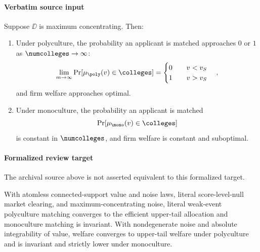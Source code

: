 \documentclass[10pt]{article}
\begin{document}
\paragraph{Verbatim source input}
\begin{ReviewVerbatim}
\begin{theorem}\label{thm:wisdom}
    Suppose $\DD$ is maximum concentrating. Then:
    \begin{enumerate}
        \item[(i)] Under polyculture, the probability an applicant is matched approaches $0$ or $1$ as $\numcolleges\rightarrow \infty$:
            \begin{equation}
                \lim_{m\rightarrow \infty} \Pr[\mu_{\poly}(v)\in \colleges]
                = \begin{cases}
                    0 &\quad v < v_S \\
                    1 &\quad v > v_S
                \end{cases}
                \quad,
            \end{equation}
            and firm welfare approaches optimal.
        \item[(ii)] Under monoculture, the probability an applicant is matched
        \begin{equation}
            \Pr[\mu_{\mono}(v)\in \colleges]
        \end{equation}
        is constant in $\numcolleges$, and firm welfare is constant and suboptimal.
    \end{enumerate}
\end{theorem}
\end{ReviewVerbatim}


\paragraph{Formalized review target}
The archival source above is not asserted equivalent to this formalized target.
\begin{ReviewVerbatim}
With atomless connected-support value and noise laws, literal score-level-null market clearing, and maximum-concentrating noise, literal weak-event polyculture matching converges to the efficient upper-tail allocation and monoculture matching is invariant. With nondegenerate noise and absolute integrability of value, welfare converges to upper-tail welfare under polyculture and is invariant and strictly lower under monoculture.
\end{ReviewVerbatim}
\end{document}
